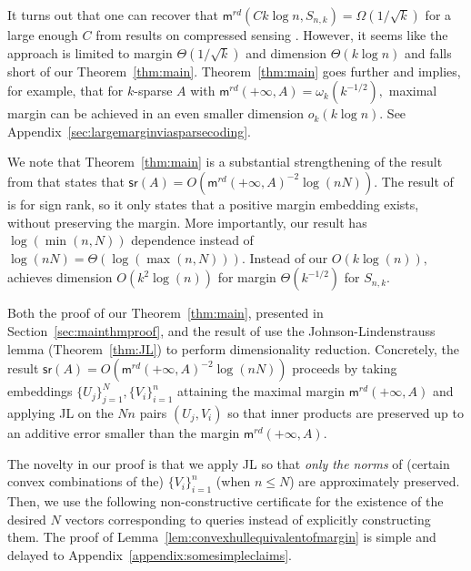 \documentclass[preprint]{article}
\newcommand{\maxmargin}{\mathsf{m}^{rd}}
\newcommand{\signrank}{\mathsf{sr}}
\newcommand{\ksparsen}{S_{n,k}}
\begin{document}
It turns out that one can recover that $\maxmargin(Ck\log n, \ksparsen) = \Omega(1/\sqrt{k})$ for a large enough $C$ from results on compressed sensing \cite{CandesTao2005}. However, it seems like the approach is limited to 
margin $\Theta(1/\sqrt{k})$ and dimension $\Theta(k\log n)$ and falls short of our Theorem~\ref{thm:main}.  Theorem~\ref{thm:main} goes further and implies, for example, that for $k$-sparse $A$ with $\maxmargin(+\infty, A) = \omega_k(k^{-1/2}),$ maximal margin can be achieved in an even smaller dimension $o_k(k\log n).$ 
See Appendix~\ref{sec:largemarginviasparsecoding}.

We note that Theorem~\ref{thm:main} is a substantial strengthening of the result from \cite{ben2002limitations} that states that $\signrank(A) = O(\maxmargin(+\infty, A)^{-2}\log(nN)).$ The result of \cite{ben2002limitations} is for sign rank, so it only states that a positive margin embedding exists, without preserving the margin. More importantly, our result has $\log(\min(n , N))$ dependence instead of 
$\log(nN) = \Theta(\log(\max(n,N))).$ Instead of our $O(k\log(n)),$ \cite{ben2002limitations} achieves dimension $O(k^2\log(n))$ for margin $\Theta(k^{-1/2})$ for $\ksparsen.$

Both the proof of our Theorem~\ref{thm:main}, presented in Section~\ref{sec:mainthmproof}, and the result of \cite{ben2002limitations} use the Johnson-Lindenstrauss lemma (Theorem~\ref{thm:JL}) to perform dimensionality reduction. Concretely, the result $\signrank(A) = O(\maxmargin(+\infty, A)^{-2}\log(nN))$ proceeds by taking embeddings $\{U_j\}_{j = 1}^N, \{V_i\}_{i = 1}^n$ attaining the maximal margin $\maxmargin(+\infty, A)$
and applying JL on the $Nn$ pairs $(U_j, V_i)$ so that inner products are preserved up to an additive error smaller than the margin $\maxmargin(+\infty, A).$ 

The novelty in our proof is that we apply JL so that \emph{only the norms} of (certain convex combinations of the) $\{V_i\}_{i = 1}^n$ (when $n\le N$) are approximately preserved. Then, we use the following non-constructive certificate for the existence of  the desired $N$ vectors corresponding to queries instead of explicitly constructing them. The proof of Lemma~\ref{lem:convexhullequivalentofmargin} is simple and delayed to Appendix~\ref{appendix:somesimpleclaims}. 
\end{document}

